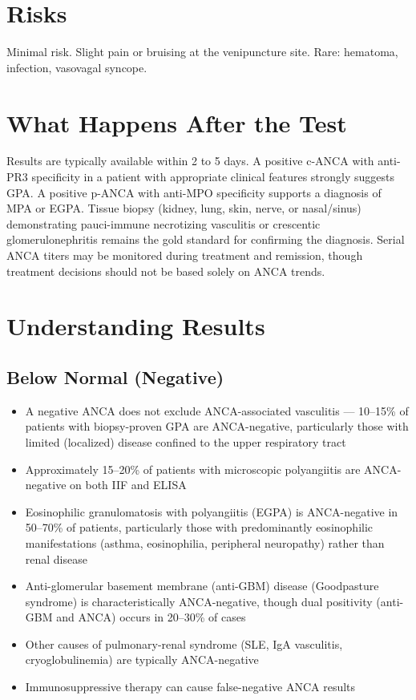 \section*{Risks}
Minimal risk. Slight pain or bruising at the venipuncture site. Rare: hematoma, infection, vasovagal syncope.

\section*{What Happens After the Test}
Results are typically available within 2 to 5 days. A positive c-ANCA with anti-PR3 specificity in a patient with appropriate clinical features strongly suggests GPA. A positive p-ANCA with anti-MPO specificity supports a diagnosis of MPA or EGPA. Tissue biopsy (kidney, lung, skin, nerve, or nasal/sinus) demonstrating pauci-immune necrotizing vasculitis or crescentic glomerulonephritis remains the gold standard for confirming the diagnosis. Serial ANCA titers may be monitored during treatment and remission, though treatment decisions should not be based solely on ANCA trends.

\section*{Understanding Results}

\subsection*{Below Normal (Negative)}
\begin{itemize}
  \item A negative ANCA does not exclude ANCA-associated vasculitis --- 10--15\% of patients with biopsy-proven GPA are ANCA-negative, particularly those with limited (localized) disease confined to the upper respiratory tract
  \item Approximately 15--20\% of patients with microscopic polyangiitis are ANCA-negative on both IIF and ELISA
  \item Eosinophilic granulomatosis with polyangiitis (EGPA) is ANCA-negative in 50--70\% of patients, particularly those with predominantly eosinophilic manifestations (asthma, eosinophilia, peripheral neuropathy) rather than renal disease
  \item Anti-glomerular basement membrane (anti-GBM) disease (Goodpasture syndrome) is characteristically ANCA-negative, though dual positivity (anti-GBM and ANCA) occurs in 20--30\% of cases
  \item Other causes of pulmonary-renal syndrome (SLE, IgA vasculitis, cryoglobulinemia) are typically ANCA-negative
  \item Immunosuppressive therapy can cause false-negative ANCA results
\end{itemize}


